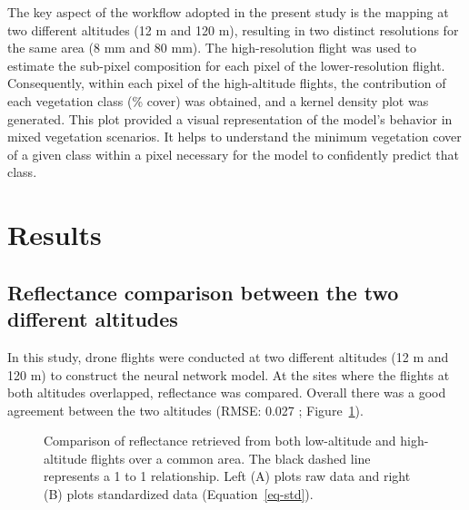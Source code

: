\documentclass[
  number]{elsarticle}
\begin{document}
The key aspect of the workflow adopted in the present study is the
mapping at two different altitudes (12 m and 120 m), resulting in two
distinct resolutions for the same area (8 mm and 80 mm). The
high-resolution flight was used to estimate the sub-pixel composition
for each pixel of the lower-resolution flight. Consequently, within each
pixel of the high-altitude flights, the contribution of each vegetation
class (\% cover) was obtained, and a kernel density plot was generated.
This plot provided a visual representation of the model's behavior in
mixed vegetation scenarios. It helps to understand the minimum
vegetation cover of a given class within a pixel necessary for the model
to confidently predict that class.

\section{Results}\label{results}

\subsection{Reflectance comparison between the two different
altitudes}\label{reflectance-comparison-between-the-two-different-altitudes}

In this study, drone flights were conducted at two different altitudes
(12 m and 120 m) to construct the neural network model. At the sites
where the flights at both altitudes overlapped, reflectance was
compared. Overall there was a good agreement between the two altitudes
(RMSE: 0.027 ; Figure~\ref{fig-CompareRef}).

\label{cell-fig-CompareRef}
\begin{figure}[H]


\caption{\label{fig-CompareRef}Comparison of reflectance retrieved from
both low-altitude and high-altitude flights over a common area. The
black dashed line represents a 1 to 1 relationship. Left (A) plots raw
data and right (B) plots standardized data (Equation~\ref{eq-std}).}

\end{figure}%
\end{document}
